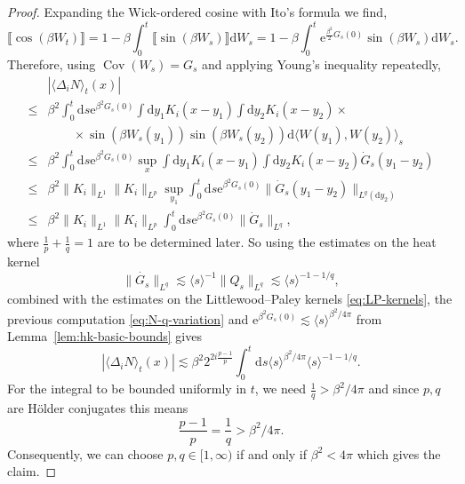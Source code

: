 \documentclass[11pt, a4paper]{scrartcl}
\numberwithin{equation}{section}
\theoremstyle{plain}
\theoremstyle{remark}
\newcommand{\mathd}{\mathrm{d}}
\newcommand{\mathe}{\mathrm{e}}
\newcommand{\tmop}[1]{\ensuremath{\operatorname{#1}}}
\begin{document}
\begin{proof}
	Expanding the Wick-ordered cosine with Ito's formula we find,
	\[ \llbracket \cos (\beta W_t) \rrbracket = 1 - \beta \int_0^t \llbracket
		\sin (\beta W_s) \rrbracket \mathd W_s = 1 - \beta \int_0^t
		\mathe^{\frac{\beta^2}{2} G_s (0)} \sin (\beta W_s) \mathd W_s . \]
	Therefore, using $\tmop{Cov} (W_s) = G_s$ and applying Young's inequality
	repeatedly,
	\begin{equation}
		\begin{aligned}
			          & | \langle \Delta_i N \rangle_t (x) |                               \\
			\leqslant & \beta^2  \int^t_0 \mathd s \mathe^{\beta^2 G_s (0)}  \int
			\mathd y_1 K_i (x - y_1)  \int \mathd y_2 K_i (x - y_2) \times                 \\
			          & \qquad \times \sin (\beta W_s (y_1)) \sin (\beta W_s (y_2)) \mathd
			\langle W (y_1), W (y_2) \rangle_s                                             \\
			\leqslant & \beta^2 \int_0^t \mathd s \mathe^{\beta^2 G_s (0)} \sup_x
			\int \mathd y_1 K_i (x - y_1)  \int \mathd y_2 K_i (x - y_2)  \dot{G}_s
			(y_1 - y_2)                                                                    \\
			\leqslant & \beta^2 \| K_i \|_{L^1} \| K_i \|_{L^p} \sup_{y_1}  \int_0^t
			\mathd s \mathe^{\beta^2 G_s (0)} \| \dot{G}_s (y_1 - y_2) \|_{L^q
			(\mathd y_2)}                                                                  \\
			\leqslant & \beta^2 \| K_i \|_{L^1} \| K_i \|_{L^p}  \int_0^t \mathd s
			\mathe^{\beta^2 G_s (0)} \| \dot{G}_s \|_{L^q},
		\end{aligned} \label{eq:N-q-variation}
	\end{equation}
	where $\frac{1}{p} + \frac{1}{q} = 1$ are to be determined later. So using
	the estimates on the heat kernel
	\[ \| \dot{G_s} \|_{L^q} \lesssim \langle s \rangle^{- 1} \| Q_s \|_{L^q}
		\lesssim \langle s \rangle^{- 1 - 1 / q}, \]
	combined with the estimates on the Littlewood--Paley kernels
	\eqref{eq:LP-kernels}, the previous computation \eqref{eq:N-q-variation} and
	$\mathe^{\beta^2 G_s (0)} \lesssim \langle s \rangle^{\beta^2 / 4 \pi}$ from
	Lemma~\ref{lem:hk-basic-bounds} gives
	\[ | \langle \Delta_i N \rangle_t (x) | \lesssim \beta^2 2^{2 i \frac{p -
					1}{p}}  \int_0^t \mathd s \langle s \rangle^{\beta^2 / 4 \pi}  \langle s
		\rangle^{- 1 - 1 / q} . \]
	For the integral to be bounded uniformly in $t$, we need $\frac{1}{q} >
		\beta^2 / 4 \pi$ and since $p, q$ are H{\"o}lder conjugates this means
	\[ \frac{p - 1}{p} = \frac{1}{q} > \beta^2 / 4 \pi . \]
	Consequently, we can choose $p, q \in [1, \infty)$ if and only if $\beta^2 <
		4 \pi$ which gives the claim.
\end{proof}
\end{document}
